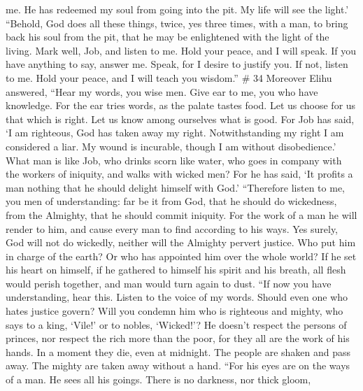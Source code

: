 me.  He has redeemed my soul from going into the pit. My
life will see the light.'  ``Behold, God does all these
things, twice, yes three times, with a man,  to bring
back his soul from the pit, that he may be enlightened with the light of
the living.  Mark well, Job, and listen to me. Hold your
peace, and I will speak.  If you have anything to say,
answer me. Speak, for I desire to justify you.  If not,
listen to me. Hold your peace, and I will teach you wisdom.'' \# 34
 Moreover Elihu answered,  ``Hear my words,
you wise men. Give ear to me, you who have knowledge.  For
the ear tries words, as the palate tastes food.  Let us
choose for us that which is right. Let us know among ourselves what is
good.  For Job has said, `I am righteous, God has taken
away my right.  Notwithstanding my right I am considered a
liar. My wound is incurable, though I am without disobedience.'
 What man is like Job, who drinks scorn like water,
 who goes in company with the workers of iniquity, and
walks with wicked men?  For he has said, `It profits a man
nothing that he should delight himself with God.' 
``Therefore listen to me, you men of understanding: far be it from God,
that he should do wickedness, from the Almighty, that he should commit
iniquity.  For the work of a man he will render to him,
and cause every man to find according to his ways.  Yes
surely, God will not do wickedly, neither will the Almighty pervert
justice.  Who put him in charge of the earth? Or who has
appointed him over the whole world?  If he set his heart
on himself, if he gathered to himself his spirit and his breath,
 all flesh would perish together, and man would turn
again to dust.  ``If now you have understanding, hear
this. Listen to the voice of my words.  Should even one
who hates justice govern? Will you condemn him who is righteous and
mighty,  who says to a king, `Vile!' or to nobles,
`Wicked!'?  He doesn't respect the persons of princes,
nor respect the rich more than the poor, for they all are the work of
his hands.  In a moment they die, even at midnight. The
people are shaken and pass away. The mighty are taken away without a
hand.  ``For his eyes are on the ways of a man. He sees
all his goings.  There is no darkness, nor thick gloom,
